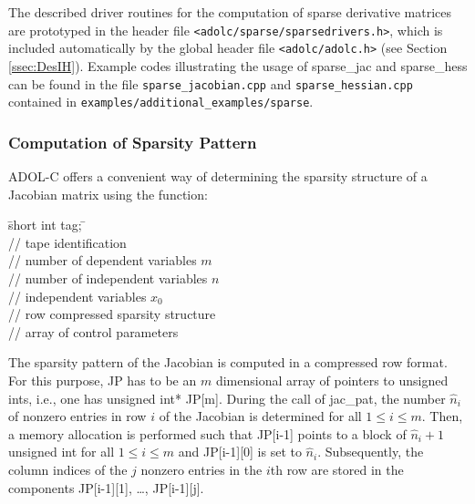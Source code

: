 \documentclass[11pt,twoside]{article}
\begin{document}
The described driver routines for the computation of sparse derivative
matrices are prototyped in the header file
\verb=<adolc/sparse/sparsedrivers.h>=, which is included automatically by the
global header file \verb=<adolc/adolc.h>= (see Section \ref{ssec:DesIH}).
Example codes illustrating the usage of {\sf
  sparse\_jac} and {\sf sparse\_hess} can be found in the file 
\verb=sparse_jacobian.cpp=  and \verb=sparse_hessian.cpp= contained in %
\verb=examples/additional_examples/sparse=.
%
\subsubsection*{Computation of Sparsity Pattern}
%
ADOL-C offers a convenient way of determining the  
sparsity structure of a Jacobian matrix using the function:
%
\begin{tabbing}
\hspace{0.5in}\={\sf short int tag;} \hspace{1.3in}\= \kill    %
\\
 \> // tape identification \\
 \> // number of dependent variables $m$\\
 \> // number of independent variables $n$\\
 \> // independent variables $x_0$\\
 \> // row compressed sparsity structure\\
 \> // array of control parameters
\end{tabbing}
%
The sparsity pattern of the
Jacobian is computed in a compressed row format. For this purpose,
{\sf JP} has to be an $m$ dimensional array of pointers to {\sf
  unsigned int}s, i.e., one has {\sf unsigned int* JP[m]}. 
During the call of  {\sf jac\_pat}, the number $\hat{n}_i$ of nonzero
entries in row $i$ of the Jacobian is determined for all $1\le i\le
m$. Then, a memory allocation is performed such that {\sf JP[i-1]}
points to a block of $\hat{n}_i+1$ {\sf  unsigned int} for all $1\le
i\le m$ and {\sf JP[i-1][0]} is set to $\hat{n}_i$. Subsequently, the
column indices of the $j$ nonzero entries in the $i$th row are stored
in the components  {\sf JP[i-1][1]}, \ldots, {\sf JP[i-1][j]}.
\end{document}
